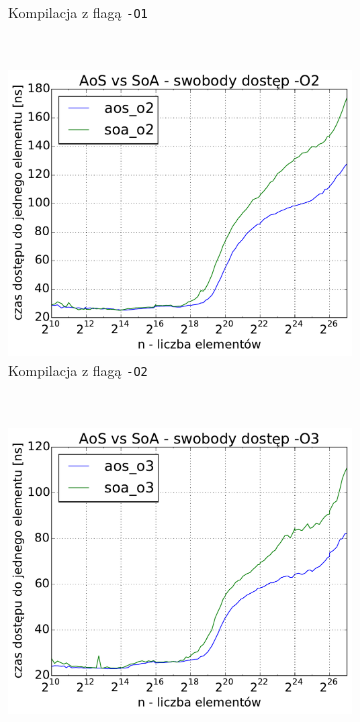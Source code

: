 \begin{figure}[!h]
\begin{subfigure}[c]{0.45\textwidth}
        \caption{Kompilacja z flagą \texttt{-O1}}
    \end{subfigure}
    \\
    \vspace{0.55cm}
    \begin{subfigure}[c]{0.45\textwidth}
        \centering
        \includegraphics[width=\textwidth]{images/benchs_xeon/random_access_aos_vs_soa_O2}
        \caption{Kompilacja z flagą \texttt{-O2}}
    \end{subfigure}
    ~
    \begin{subfigure}[c]{0.45\textwidth}
        \centering
        \includegraphics[width=\textwidth]{images/benchs_xeon/random_access_aos_vs_soa_O3}

\end{subfigure}
\end{figure}
